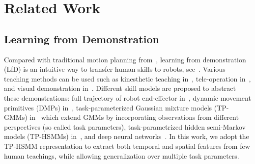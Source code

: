 \section{Related Work}\label{sec:related}

\subsection{Learning from Demonstration}\label{sec:lfd-review}
Compared with traditional motion planning from~\cite{lavalle2006planning}, learning from demonstration (LfD) is an intuitive way to transfer human skills to robots, see~\cite{calinon2016tutorial, Osa2018Imitation, pathak2018zero}.
Various teaching methods can be used such as kinesthetic teaching in~\cite{calinon2016tutorial}, tele-operation in~\cite{abbeel2004apprenticeship}, and visual demonstration in~\cite{pathak2018zero}. 
Different skill models are proposed to abstract these demonstrations: 
full trajectory of robot end-effector in~\cite{Osa2018Imitation}, 
dynamic movement primitives (DMPs) in~\cite{paraschos2013probabilistic, rozo2016learning},
task-parameterized Gaussian mixture models (TP-GMMs) in~\cite{calinon2016tutorial, Zeestraten17riemannian} which extend GMMs by incorporating observations from different perspectives (so called task parameters),
task-parametrized hidden semi-Markov models (TP-HSMMs) in~\cite{Schwenkel2019Optimizing, rozo2020learning,le2021learning},
and deep neural networks~\cite{pathak2018zero}.
In this work, we adopt the TP-HSMM representation to extract both temporal and spatial features from few human teachings, while allowing generalization over multiple task parameters.


